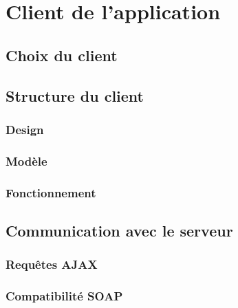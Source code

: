\chapter{Client de l'application}


\section{Choix du client}


\section{Structure du client}
\subsection{Design}
\subsection{Modèle}
\subsection{Fonctionnement}


\section{Communication avec le serveur}
\subsection{Requêtes AJAX}
\subsection{Compatibilité SOAP}
